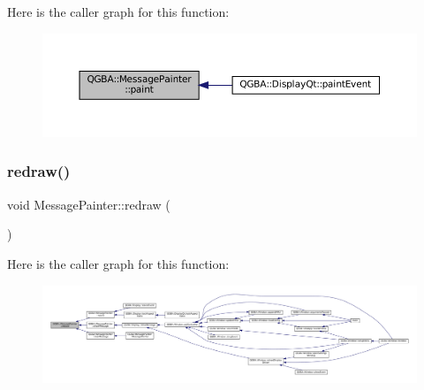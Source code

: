 Here is the caller graph for this function\+:
\nopagebreak
\begin{figure}[H]
\begin{center}
\leavevmode
\includegraphics[width=350pt]{class_q_g_b_a_1_1_message_painter_a2c8a4b2a2935f3d1033260768aa36796_icgraph}
\end{center}
\end{figure}
\mbox{\label{class_q_g_b_a_1_1_message_painter_ad6d1f2533c2e7bd5afa17814044adc8d}} 
\subsubsection{\texorpdfstring{redraw()}{redraw()}}
{\footnotesize\ttfamily void Message\+Painter\+::redraw (\begin{DoxyParamCaption}{ }\end{DoxyParamCaption})\hspace{0.3cm}{\ttfamily [private]}}

Here is the caller graph for this function\+:
\nopagebreak
\begin{figure}[H]
\begin{center}
\leavevmode
\includegraphics[width=350pt]{class_q_g_b_a_1_1_message_painter_ad6d1f2533c2e7bd5afa17814044adc8d_icgraph}
\end{center}
\end{figure}
\mbox{\label{class_q_g_b_a_1_1_message_painter_aa5b77ba11d3fb71e85765c279944495c}} 
